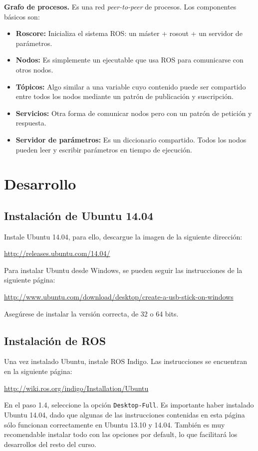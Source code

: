 \documentclass[a4paper,12pt]{article}
\begin{document}
\textbf{Grafo de procesos.} Es una red \textit{peer-to-peer} de procesos. Los componentes básicos son:
\begin{itemize}
\item \textbf{Roscore:} Inicializa el sistema ROS: un máster + rosout + un servidor de parámetros.
\item \textbf{Nodos:} Es simplemente un ejecutable que usa ROS para comunicarse con otros nodos.
\item \textbf{Tópicos:} Algo similar a una variable cuyo contenido puede ser compartido entre todos los nodos mediante un patrón de publicación y suscripción. 
\item \textbf{Servicios:} Otra forma de comunicar nodos pero con un patrón de petición y respuesta.
\item \textbf{Servidor de parámetros:} Es un diccionario compartido. Todos los nodos pueden leer y escribir parámetros en tiempo de ejecución.
\end{itemize}

\section{Desarrollo}
\subsection{Instalación de Ubuntu 14.04}
Instale Ubuntu 14.04, para ello, descargue la imagen de la siguiente dirección:

\url{http://releases.ubuntu.com/14.04/}

Para instalar Ubuntu desde Windows, se pueden seguir las instrucciones de la siguiente página:

\url{http://www.ubuntu.com/download/desktop/create-a-usb-stick-on-windows}

Asegúrese de instalar la versión correcta, de 32 o 64 bits. 

\subsection{Instalación de ROS}

Una vez instalado Ubuntu, instale ROS Indigo. Las instrucciones se encuentran en la siguiente página:

\url{http://wiki.ros.org/indigo/Installation/Ubuntu}

En el paso 1.4, seleccione la opción \texttt{Desktop-Full}. Es importante haber instalado Ubuntu 14.04, dado que algunas de las instrucciones contenidas en esta página sólo funcionan correctamente en Ubuntu 13.10 y 14.04. También es muy recomendable instalar todo con las opciones por default, lo que facilitará los desarrollos del resto del curso. 
\end{document}
